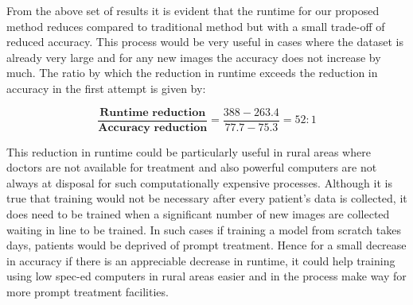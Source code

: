 \documentclass[12pt]{report}
\begin{document}
\noindent From the above set of results it is evident that the runtime for our proposed method reduces compared to traditional method but with a small trade-off of reduced accuracy. This process would be very useful in cases where the dataset is already very large and for any new images the accuracy does not increase by much. The ratio by which the reduction in runtime exceeds the reduction in accuracy in the first attempt is given by:
 
$$
\frac{\textbf{Runtime reduction}}{\textbf{Accuracy reduction}} = \frac{388-263.4}{77.7-75.3} = 52:1
$$

\noindent This reduction in runtime could be particularly useful in rural areas where doctors are not available for treatment and also powerful computers are not always at disposal for such computationally expensive processes. Although it is true that training would not be necessary after every patient's data is collected, it does need to be trained when a significant number of new images are collected waiting in line to be trained. In such cases if training a model from scratch takes days, patients would be deprived of prompt treatment. Hence for a small decrease in accuracy if there is an appreciable decrease in runtime, it could help training using low spec-ed computers in rural areas easier and in the process make way for more prompt treatment facilities.
\end{document}
